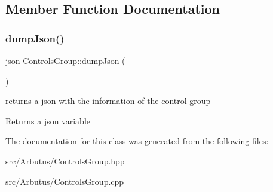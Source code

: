 \subsection{Member Function Documentation}
\mbox{\label{class_controls_group_a603fcb3050fd34c148a0bb4e85890474}} 
\subsubsection{\texorpdfstring{dump\+Json()}{dumpJson()}}
{\footnotesize\ttfamily json Controls\+Group\+::dump\+Json (\begin{DoxyParamCaption}{ }\end{DoxyParamCaption})}



returns a json with the information of the control group 

\begin{DoxyReturn}{Returns}
a json variable 
\end{DoxyReturn}


The documentation for this class was generated from the following files\+:\begin{DoxyCompactItemize}
\item 
src/\+Arbutus/Controls\+Group.\+hpp\item 
src/\+Arbutus/Controls\+Group.\+cpp\end{DoxyCompactItemize}
